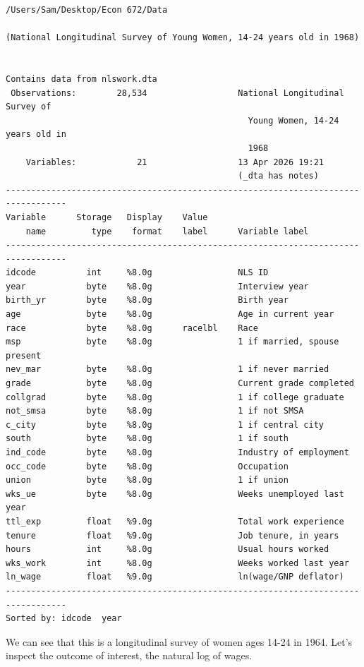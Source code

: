 \documentclass[
]{book}
\begin{document}
\begin{verbatim}
/Users/Sam/Desktop/Econ 672/Data

(National Longitudinal Survey of Young Women, 14-24 years old in 1968)


Contains data from nlswork.dta
 Observations:        28,534                  National Longitudinal Survey of
                                                Young Women, 14-24 years old in
                                                1968
    Variables:            21                  13 Apr 2026 19:21
                                              (_dta has notes)
----------------------------------------------------------------------------------
Variable      Storage   Display    Value
    name         type    format    label      Variable label
----------------------------------------------------------------------------------
idcode          int     %8.0g                 NLS ID
year            byte    %8.0g                 Interview year
birth_yr        byte    %8.0g                 Birth year
age             byte    %8.0g                 Age in current year
race            byte    %8.0g      racelbl    Race
msp             byte    %8.0g                 1 if married, spouse present
nev_mar         byte    %8.0g                 1 if never married
grade           byte    %8.0g                 Current grade completed
collgrad        byte    %8.0g                 1 if college graduate
not_smsa        byte    %8.0g                 1 if not SMSA
c_city          byte    %8.0g                 1 if central city
south           byte    %8.0g                 1 if south
ind_code        byte    %8.0g                 Industry of employment
occ_code        byte    %8.0g                 Occupation
union           byte    %8.0g                 1 if union
wks_ue          byte    %8.0g                 Weeks unemployed last year
ttl_exp         float   %9.0g                 Total work experience
tenure          float   %9.0g                 Job tenure, in years
hours           int     %8.0g                 Usual hours worked
wks_work        int     %8.0g                 Weeks worked last year
ln_wage         float   %9.0g                 ln(wage/GNP deflator)
----------------------------------------------------------------------------------
Sorted by: idcode  year
\end{verbatim}

We can see that this is a longitudinal survey of women ages 14-24 in 1964. Let's inspect the outcome of interest, the natural log of wages.
\end{document}
